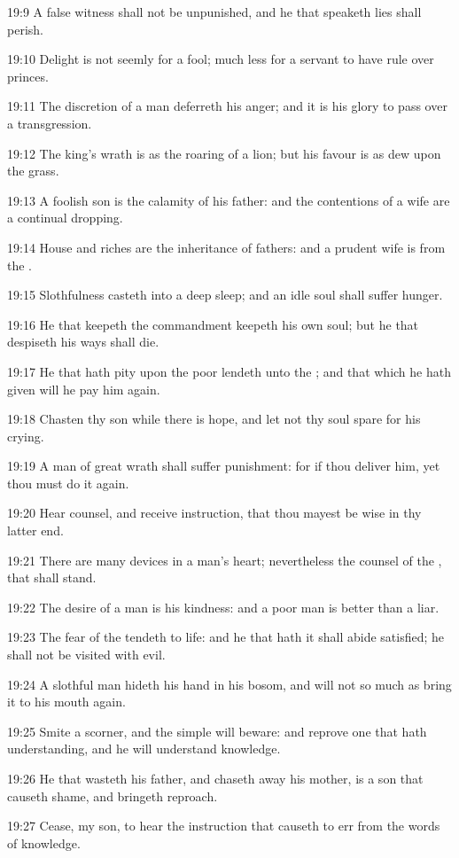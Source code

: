 19:9 A false witness shall not be unpunished, and he that speaketh lies shall perish.

19:10 Delight is not seemly for a fool; much less for a servant to have rule over princes.

19:11 The discretion of a man deferreth his anger; and it is his glory to pass over a transgression.

19:12 The king's wrath is as the roaring of a lion; but his favour is as dew upon the grass.

19:13 A foolish son is the calamity of his father: and the contentions of a wife are a continual dropping.

19:14 House and riches are the inheritance of fathers: and a prudent wife is from the \LORD.

19:15 Slothfulness casteth into a deep sleep; and an idle soul shall suffer hunger.

19:16 He that keepeth the commandment keepeth his own soul; but he that despiseth his ways shall die.

19:17 He that hath pity upon the poor lendeth unto the \LORD; and that which he hath given will he pay him again.

19:18 Chasten thy son while there is hope, and let not thy soul spare for his crying.

19:19 A man of great wrath shall suffer punishment: for if thou deliver him, yet thou must do it again.

19:20 Hear counsel, and receive instruction, that thou mayest be wise in thy latter end.

19:21 There are many devices in a man's heart; nevertheless the counsel of the \LORD, that shall stand.

19:22 The desire of a man is his kindness: and a poor man is better than a liar.

19:23 The fear of the \LORD tendeth to life: and he that hath it shall abide satisfied; he shall not be visited with evil.

19:24 A slothful man hideth his hand in his bosom, and will not so much as bring it to his mouth again.

19:25 Smite a scorner, and the simple will beware: and reprove one that hath understanding, and he will understand knowledge.

19:26 He that wasteth his father, and chaseth away his mother, is a son that causeth shame, and bringeth reproach.

19:27 Cease, my son, to hear the instruction that causeth to err from the words of knowledge.

